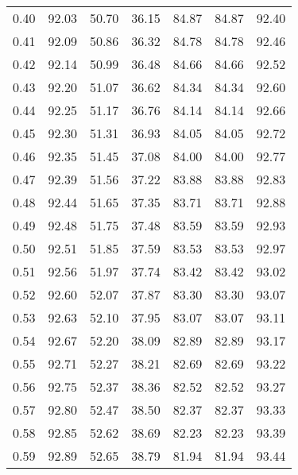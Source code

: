 \begin{tabular}{|c|c|c|c|c|c|c|}
      0.40 &     92.03 &     50.70 &      36.15 &   84.87 &      84.87 &         92.40 \\
      0.41 &     92.09 &     50.86 &      36.32 &   84.78 &      84.78 &         92.46 \\
      0.42 &     92.14 &     50.99 &      36.48 &   84.66 &      84.66 &         92.52 \\
      0.43 &     92.20 &     51.07 &      36.62 &   84.34 &      84.34 &         92.60 \\
      0.44 &     92.25 &     51.17 &      36.76 &   84.14 &      84.14 &         92.66 \\
      0.45 &     92.30 &     51.31 &      36.93 &   84.05 &      84.05 &         92.72 \\
      0.46 &     92.35 &     51.45 &      37.08 &   84.00 &      84.00 &         92.77 \\
      0.47 &     92.39 &     51.56 &      37.22 &   83.88 &      83.88 &         92.83 \\
      0.48 &     92.44 &     51.65 &      37.35 &   83.71 &      83.71 &         92.88 \\
      0.49 &     92.48 &     51.75 &      37.48 &   83.59 &      83.59 &         92.93 \\
      0.50 &     92.51 &     51.85 &      37.59 &   83.53 &      83.53 &         92.97 \\
      0.51 &     92.56 &     51.97 &      37.74 &   83.42 &      83.42 &         93.02 \\
      0.52 &     92.60 &     52.07 &      37.87 &   83.30 &      83.30 &         93.07 \\
      0.53 &     92.63 &     52.10 &      37.95 &   83.07 &      83.07 &         93.11 \\
      0.54 &     92.67 &     52.20 &      38.09 &   82.89 &      82.89 &         93.17 \\
      0.55 &     92.71 &     52.27 &      38.21 &   82.69 &      82.69 &         93.22 \\
      0.56 &     92.75 &     52.37 &      38.36 &   82.52 &      82.52 &         93.27 \\
      0.57 &     92.80 &     52.47 &      38.50 &   82.37 &      82.37 &         93.33 \\
      0.58 &     92.85 &     52.62 &      38.69 &   82.23 &      82.23 &         93.39 \\
      0.59 &     92.89 &     52.65 &      38.79 &   81.94 &      81.94 &         93.44 \\

\end{tabular}
